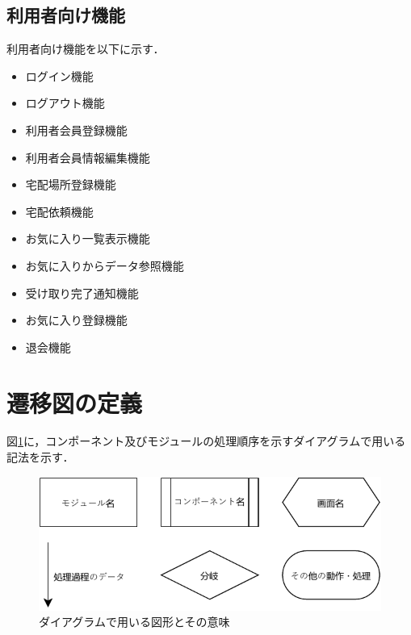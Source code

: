 \documentclass[a4paper, titlepage]{jsarticle}
\begin{document}
\subsection{利用者向け機能}
利用者向け機能を以下に示す．
\begin{itemize}[labelwidth=\linewidth]
  \setlength{\leftskip}{1em}

  \item ログイン機能 %
  \item ログアウト機能 %
  \item 利用者会員登録機能 %
  \item 利用者会員情報編集機能 %
  \item 宅配場所登録機能 %
  \item 宅配依頼機能 %
  \item お気に入り一覧表示機能 %
  \item お気に入りからデータ参照機能 %
  \item 受け取り完了通知機能 %
  \item お気に入り登録機能 %
  \item 退会機能 %
\end{itemize}

\clearpage
\section{遷移図の定義}
図\ref{fig:def_module_diagram}に，コンポーネント及びモジュールの処理順序を示すダイアグラムで用いる記法を示す．

\begin{figure}[H]
  \centering
  \includegraphics[width=\linewidth]{fig/rule.pdf}
  \caption{ダイアグラムで用いる図形とその意味}
  \label{fig:def_module_diagram}
\end{figure}
\end{document}
